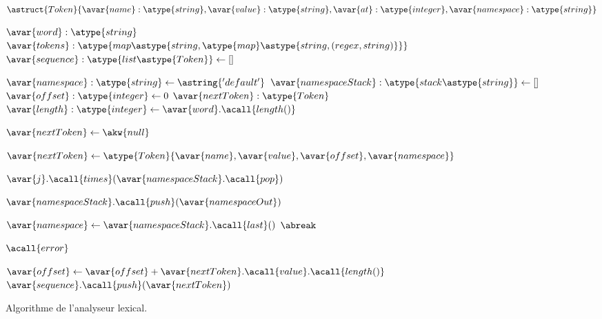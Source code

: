 \begin{figure}

\begin{algorithmic}[1]

\State $\astruct{Token}\{
    \avar{name}: \atype{string},
    \avar{value}: \atype{string},
    \avar{at}: \atype{integer},
    \avar{namespace}: \atype{string}
\}$


  \Require $\avar{word}: \atype{string}$
  \Require $\avar{tokens}: \atype{map\astype{string, \atype{map}\astype{string, (regex, string)}}}$
  \Ensure  $\avar{sequence}: \atype{list\astype{Token}} \gets []$

  \State $\avar{namespace}: \atype{string} \gets \astring{'default'}$
  \State $\avar{namespaceStack}: \atype{stack\astype{string}} \gets []$
  \State $\avar{offset}: \atype{integer} \gets 0$
  \State $\avar{nextToken}: \atype{Token}$
  \State $\avar{length}: \atype{integer} \gets \avar{word}.\acall{length()}$


      \State $\avar{nextToken} \gets \akw{null}$



              \State $\avar{nextToken} \gets \atype{Token}\{\avar{name}, \avar{value}, \avar{offset}, \avar{namespace}\}$


                  \State $\avar{j}.\acall{times}(\avar{namespaceStack}.\acall{pop})$

              \Else

                  \State $\avar{namespaceStack}.\acall{push}(\avar{namespaceOut})$

              \EndIf

              \State $\avar{namespace} \gets \avar{namespaceStack}.\acall{last}()$
              \State $\abreak$

          \EndIf

      \EndFor


        \State $\acall{error}$

      \EndIf

      \State $\avar{offset} \gets \avar{offset} + \avar{nextToken}.\acall{value}.\acall{length()}$
      \State $\avar{sequence}.\acall{push}(\avar{nextToken})$

  \EndWhile

\EndFunction

\end{algorithmic}

\caption{\label{figure:data:algo_lexer} Algorithme de l'analyseur lexical.}

\end{figure}


